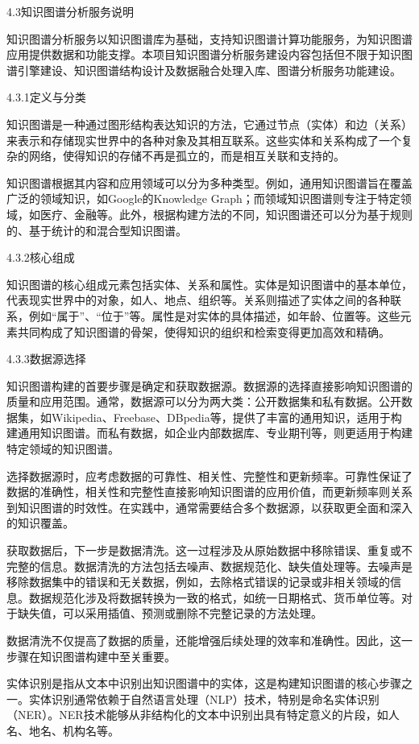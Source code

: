 4.3知识图谱分析服务说明

知识图谱分析服务以知识图谱库为基础，支持知识图谱计算功能服务，为知识图谱应用提供数据和功能支撑。本项目知识图谱分析服务建设内容包括但不限于知识图谱引擎建设、知识图谱结构设计及数据融合处理入库、图谱分析服务功能建设。

4.3.1定义与分类

知识图谱是一种通过图形结构表达知识的方法，它通过节点（实体）和边（关系）来表示和存储现实世界中的各种对象及其相互联系。这些实体和关系构成了一个复杂的网络，使得知识的存储不再是孤立的，而是相互关联和支持的。

知识图谱根据其内容和应用领域可以分为多种类型。例如，通用知识图谱旨在覆盖广泛的领域知识，如Google的Knowledge Graph；而领域知识图谱则专注于特定领域，如医疗、金融等。此外，根据构建方法的不同，知识图谱还可以分为基于规则的、基于统计的和混合型知识图谱。

4.3.2核心组成

知识图谱的核心组成元素包括实体、关系和属性。实体是知识图谱中的基本单位，代表现实世界中的对象，如人、地点、组织等。关系则描述了实体之间的各种联系，例如“属于”、“位于”等。属性是对实体的具体描述，如年龄、位置等。这些元素共同构成了知识图谱的骨架，使得知识的组织和检索变得更加高效和精确。

4.3.3数据源选择

知识图谱构建的首要步骤是确定和获取数据源。数据源的选择直接影响知识图谱的质量和应用范围。通常，数据源可以分为两大类：公开数据集和私有数据。公开数据集，如Wikipedia、Freebase、DBpedia等，提供了丰富的通用知识，适用于构建通用知识图谱。而私有数据，如企业内部数据库、专业期刊等，则更适用于构建特定领域的知识图谱。

选择数据源时，应考虑数据的可靠性、相关性、完整性和更新频率。可靠性保证了数据的准确性，相关性和完整性直接影响知识图谱的应用价值，而更新频率则关系到知识图谱的时效性。在实践中，通常需要结合多个数据源，以获取更全面和深入的知识覆盖。

获取数据后，下一步是数据清洗。这一过程涉及从原始数据中移除错误、重复或不完整的信息。数据清洗的方法包括去噪声、数据规范化、缺失值处理等。去噪声是移除数据集中的错误和无关数据，例如，去除格式错误的记录或非相关领域的信息。数据规范化涉及将数据转换为一致的格式，如统一日期格式、货币单位等。对于缺失值，可以采用插值、预测或删除不完整记录的方法处理。

数据清洗不仅提高了数据的质量，还能增强后续处理的效率和准确性。因此，这一步骤在知识图谱构建中至关重要。

实体识别是指从文本中识别出知识图谱中的实体，这是构建知识图谱的核心步骤之一。实体识别通常依赖于自然语言处理（NLP）技术，特别是命名实体识别（NER）。NER技术能够从非结构化的文本中识别出具有特定意义的片段，如人名、地名、机构名等。

